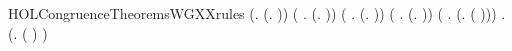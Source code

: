 \newcommand{\HOLCongruenceTheoremsWGXXind}{\UseVerbatim{HOLCongruenceTheoremsWGXXind}}
\begin{SaveVerbatim}{HOLCongruenceTheoremsWGXXrules}
\HOLTokenTurnstile{} (\HOLSymConst{\HOLTokenForall{}}.  (\HOLTokenLambda{}. )) \HOLSymConst{\HOLTokenConj{}} (\HOLSymConst{\HOLTokenForall{}} .   \HOLSymConst{\HOLTokenImp{}}  (\HOLTokenLambda{}.  )) \HOLSymConst{\HOLTokenConj{}}
   (\HOLSymConst{\HOLTokenForall{}} .   \HOLSymConst{\HOLTokenConj{}}   \HOLSymConst{\HOLTokenImp{}}  (\HOLTokenLambda{}.   \HOLSymConst{\ensuremath{+}}  )) \HOLSymConst{\HOLTokenConj{}}
   (\HOLSymConst{\HOLTokenForall{}} .   \HOLSymConst{\HOLTokenConj{}}   \HOLSymConst{\HOLTokenImp{}}  (\HOLTokenLambda{}.   \HOLSymConst{\ensuremath{\parallel}}  )) \HOLSymConst{\HOLTokenConj{}}
   (\HOLSymConst{\HOLTokenForall{}} .   \HOLSymConst{\HOLTokenImp{}}  (\HOLTokenLambda{}. \HOLConst{\ensuremath{\nu}}  ( ))) \HOLSymConst{\HOLTokenConj{}}
   \HOLSymConst{\HOLTokenForall{}} .   \HOLSymConst{\HOLTokenImp{}}  (\HOLTokenLambda{}.  ( ) )
\end{SaveVerbatim}
\newcommand{\HOLCongruenceTheoremsWGXXrules}{\UseVerbatim{HOLCongruenceTheoremsWGXXrules}}

